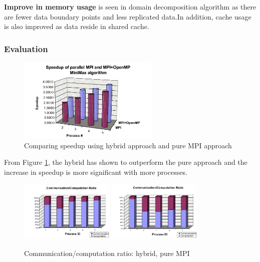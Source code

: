 \documentclass[12pt]{article}
\begin{document}
\noindent \textbf{Improve in memory usage} is seen in domain decomposition algorithm as
there are fewer data boundary points and less replicated data.In addition, cache
usage is also improved as data reside in shared cache.

\subsubsection{Evaluation}

\begin{figure}[H]
  \centering
  \includegraphics[width=0.6\textwidth, height=0.4\textwidth]{speedup_models.png}
  \caption{Comparing speedup using hybrid approach and pure MPI approach}
  \label{fig:speedup_models}
\end{figure}

From Figure \ref{fig:speedup_models}, the hybrid has shown to outperform the pure
approach and the increase in speedup is more significant with more processes. 

\begin{figure}[H]
  \centering
  \includegraphics[width=0.4\textwidth,
  height=0.3\textwidth]{communication_ratio1.png} \hfill
  \includegraphics[width=0.4\textwidth,
  height=0.3\textwidth]{communication_ratio2.png}
  \caption{Communication/computation ratio: hybrid, pure MPI}
  \label{fig:communication_ratio}
\end{figure}
\end{document}
